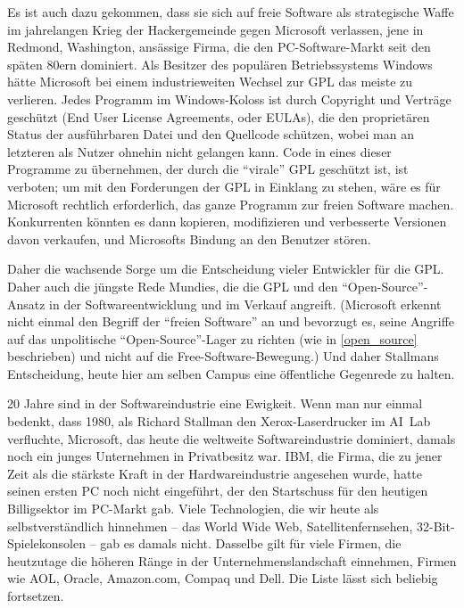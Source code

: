 Es ist auch dazu gekommen, dass sie sich auf freie Software als strategische Waffe im jahrelangen Krieg der Hackergemeinde gegen Microsoft verlassen, jene in Redmond, Washington, ansässige Firma, die den PC-Software-Markt seit den späten 80ern dominiert. Als Besitzer des populären Betriebssystems Windows hätte Microsoft bei einem industrieweiten Wechsel zur GPL das meiste zu verlieren. Jedes Programm im Windows-Koloss ist durch Copyright und Verträge geschützt (End User License Agreements, oder EULAs), die den proprietären Status der ausführbaren Datei und den Quellcode schützen, wobei man an letzteren als Nutzer ohnehin nicht gelangen kann. Code in eines dieser Programme zu übernehmen, der durch die "`virale"' GPL geschützt ist, ist verboten; um mit den Forderungen der GPL in Einklang zu stehen, wäre es für Microsoft rechtlich erforderlich, das ganze Programm zur freien Software machen. Konkurrenten könnten es dann kopieren, modifizieren und verbesserte Versionen davon verkaufen, und Microsofts Bindung an den Benutzer stören.

Daher die wachsende Sorge um die Entscheidung vieler Entwickler für die GPL. Daher auch die jüngste Rede Mundies, die die GPL und den "`Open-Source"'-Ansatz in der Softwareentwicklung und im Verkauf angreift. (Microsoft erkennt nicht einmal den Begriff der "`freien Software"' an und bevorzugt es, seine Angriffe auf das unpolitische "`Open-Source"'-Lager zu richten (wie in \autoref{open_source} beschrieben) und nicht auf die Free-Software-Bewegung.) Und daher Stallmans Entscheidung, heute hier am selben Campus eine öffentliche Gegenrede zu halten.

20 Jahre sind in der Softwareindustrie eine Ewigkeit. Wenn man nur einmal bedenkt, dass 1980, als Richard Stallman den Xerox-Laserdrucker im AI~Lab verfluchte, Microsoft, das heute die weltweite Softwareindustrie dominiert, damals noch ein junges Unternehmen in Privatbesitz war. IBM, die Firma, die zu jener Zeit als die stärkste Kraft in der Hardwareindustrie angesehen wurde, hatte seinen ersten PC noch nicht eingeführt, der den Startschuss für den heutigen Billigsektor im PC-Markt gab. Viele Technologien, die wir heute als selbstverständlich hinnehmen – das World Wide Web, Satellitenfernsehen, 32-Bit-Spielekonsolen – gab es damals nicht. Dasselbe gilt für viele Firmen, die heutzutage die höheren Ränge in der Unternehmenslandschaft einnehmen, Firmen wie AOL, Oracle, Amazon.com, Compaq und Dell. Die Liste lässt sich beliebig fortsetzen.


